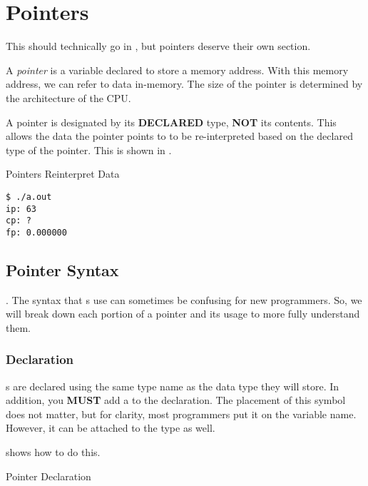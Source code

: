 \section{Pointers}\label{sec:Pointers}
This should technically go in , but pointers deserve their own section.

\begin{definition}[Pointer]\label{def:Pointer}
A \emph{pointer} is a variable declared to store a memory address.
With this memory address, we can refer to data in-memory.
The size of the pointer is determined by the architecture of the CPU.\@
\end{definition}

A pointer is designated by its \textbf{DECLARED} type, \textbf{NOT} its contents.
This allows the data the pointer points to to be re-interpreted based on the declared type of the pointer.
This is shown in .

\begin{listing}[h!tbp]
\caption{Pointers Reinterpret Data}
\label{lst:Pointers_Reinterpret_Data}

\begin{verbatim}
$ ./a.out
ip: 63
cp: ?
fp: 0.000000
\end{verbatim}
\end{listing}

\subsection{Pointer Syntax}\label{subsec:Pointer_Syntax}.
The syntax that s use can sometimes be confusing for new programmers.
So, we will break down each portion of a pointer and its usage to more fully understand them.

\subsubsection{Declaration}\label{subsubsec:Pointer_Declaration}
s are declared using the same type name as the data type they will store.
In addition, you \textbf{MUST} add a \cinline{*} to the declaration.
The placement of this symbol does not matter, but for clarity, most programmers put it on the variable name.
However, it can be attached to the type as well.

 shows how to do this.
\begin{listing}[h!tbp]
\caption{Pointer Declaration}
\label{lst:Pointer_Declaration}
\end{listing}


